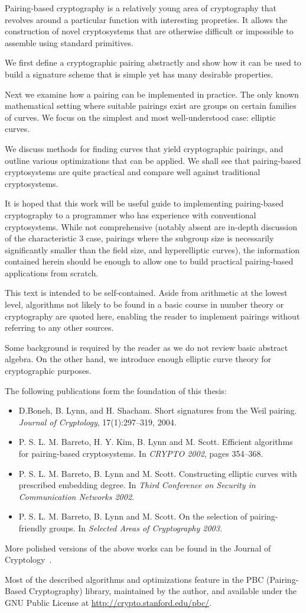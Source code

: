 \beforepreface
{}
Pairing-based cryptography is a relatively young area of cryptography that
revolves around a particular function with interesting propreties.
It allows the construction of novel cryptosystems that are otherwise
difficult or impossible to assemble using standard primitives.

We first define a cryptographic pairing abstractly and show how it
can be used to build a signature scheme that is simple yet has many
desirable properties.

Next we examine how a pairing can be implemented in practice. The only known
mathematical setting where suitable pairings exist are groups on certain
families of curves. We focus on the simplest and most well-understood case:
elliptic curves.

We discuss methods for finding curves that yield cryptographic pairings,
and outline various optimizations that can be applied. We shall see that
pairing-based cryptosystems are quite practical and compare well against
traditional cryptosystems.

It is hoped that this work will be useful guide to implementing pairing-based
cryptography to a programmer who has experience with conventional
cryptosystems. While not comprehensive (notably absent are in-depth
discussion of the characteristic 3 case, pairings where
the subgroup size is necessarily significantly smaller than the field size,
and hyperelliptic curves),
the information contained herein should be enough to allow one to build
practical pairing-based applications from scratch.

This text is intended to be self-contained. Aside from
arithmetic at the lowest level, algorithms not likely to
be found in a basic course in number theory or cryptography are quoted here,
enabling the reader to implement pairings without referring to any other
sources.

Some background is required by the reader as
we do not review basic abstract algebra.
On the other hand, we introduce enough elliptic curve theory for
cryptographic purposes.

The following publications
form the foundation of this thesis:
\begin{itemize}
\item D.Boneh, B. Lynn, and H. Shacham. Short signatures from the Weil pairing.
{\it Journal of Cryptology}, 17(1):297--319, 2004.
\item
P. S. L. M. Barreto, H. Y. Kim, B. Lynn and M. Scott.
Efficient algorithms for pairing-based cryptosystems. In {\it CRYPTO 2002},
pages 354--368.
\item P. S. L. M. Barreto, B. Lynn and M. Scott.
Constructing elliptic curves with prescribed embedding degree. In {\it Third
Conference on Security in Communication Networks 2002}.
\item P. S. L. M. Barreto, B. Lynn and M. Scott.
On the selection of pairing-friendly groups. In {\it Selected Areas of Cryptography 2003}.
\end{itemize}
More polished versions of the above works can be found
in the Journal of Cryptology~\cite{blsjournal, balsjournal}.

Most of the described algorithms and optimizations
feature in the PBC (Pairing-Based Cryptography) library, maintained by the
author, and available under the GNU Public License at 
\url{http://crypto.stanford.edu/pbc/}.

